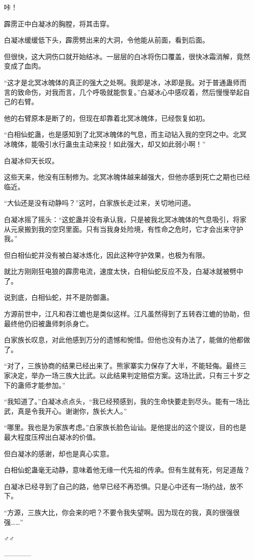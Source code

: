\begin{this_body}
咔！

霹雳正中白凝冰的胸膛，将其击穿。

白凝冰缓缓低下头，霹雳劈出来的大洞，令他能从前面，看到后面。

但很快，这大洞伤口就开始结冰。一层层的白冰将伤口覆盖，很快冰霜消解，竟然变成了血肉。

“这才是北冥冰魄体的真正的强大之处啊。我即是冰，冰即是我。对于普通蛊师而言的致命伤，对我而言，几个呼吸就能恢复。”白凝冰心中感叹着，然后慢慢举起自己的右臂。

他的右臂原本是断了的，但现在却靠着北冥冰魄体，已经恢复如初。

“白相仙蛇蛊，也是感知到了北冥冰魄体的气息，而主动钻入我的空窍之中。北冥冰魄体，能吸引水行蛊虫主动来投！如此强大，却又如此弱小啊！”

白凝冰仰天长叹。

这些天来，他没有压制修为。北冥冰魄体越来越强大，但他亦感到死亡之期也已经临近。

“大仙还是没有动静吗？”这时，白家族长走过来，关切地问道。

白凝冰摇了摇头：“这蛇蛊并没有承认我，只是被我北冥冰魄体的气息吸引，将家从元泉搬到我的空窍里面。只有当我身处险境，有性命之危时，它才会出来守护我。”

但白相仙蛇并没有被白凝冰炼化，因此这种守护效果，也极为有限。

就比方刚刚狂电狼的霹雳电流，速度太快，白相仙蛇反应不及，白凝冰就被劈中了。

说到底，白相仙蛇，并不是防御蛊。

方源前世中，江凡和吞江蟾也是类似这样。江凡虽然得到了五转吞江蟾的协助，但最终他仍旧被蛊师刺杀身亡。

白家族长叹息，对此他感到万分的遗憾和惋惜。但他也没有办法了，能做的他都做了。

“对了，三族协商的结果已经出来了。熊家寨实力保存了大半，不能轻侮。最终三家决定，举办一场三族大比武。以此结果判定赔偿方案。这场比武，只有三十岁之下的蛊师才能参加。”

“我知道了。”白凝冰点点头，“我已经预感到，我的生命快要走到尽头。能有一场比武，真是令我开心。谢谢你，族长大人。”

“哪里。我也是为家族考虑。”白家族长脸色讪讪。是他提出的这个提议，目的也是最大程度压榨出白凝冰的价值。

但白凝冰的感谢，却也是真心实意。

白相仙蛇蛊毫无动静，意味着他无缘一代先祖的传承。但有生就有死，何足道哉？

白凝冰已经寻到了自己的路，他早已经不再恐惧。只是心中还有一场约战，放不下。

“方源，三族大比，你会来的吧？不要令我失望啊。因为现在的我，真的很强很强……”

♂♂

------------

\end{this_body}

